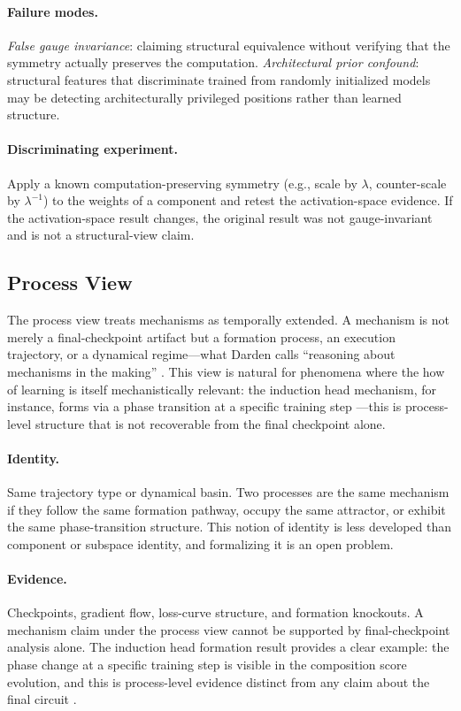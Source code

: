 \documentclass{article}
\begin{document}
\paragraph{Failure modes.}
\emph{False gauge invariance}: claiming structural equivalence without
verifying that the symmetry actually preserves the computation.
\emph{Architectural prior confound}: structural features that
discriminate trained from randomly initialized models may be detecting
architecturally privileged positions rather than learned structure.

\paragraph{Discriminating experiment.}
Apply a known computation-preserving symmetry (e.g., scale by $\lambda$,
counter-scale by $\lambda^{-1}$) to the weights of a component and
retest the activation-space evidence.  If the activation-space result
changes, the original result was not gauge-invariant and is not a
structural-view claim.

\subsection{Process View}

The process view treats mechanisms as temporally extended.  A mechanism
is not merely a final-checkpoint artifact but a formation process, an
execution trajectory, or a dynamical regime---what Darden calls
``reasoning about mechanisms in the making'' \citep{darden2006}.  This
view is natural for phenomena where the how of learning is itself
mechanistically relevant:
the induction head mechanism, for instance, forms via a phase transition
at a specific training step \citep{olsson2022}---this is process-level
structure that is not recoverable from the final checkpoint alone.

\paragraph{Identity.}
Same trajectory type or dynamical basin.  Two processes are the same
mechanism if they follow the same formation pathway, occupy the same
attractor, or exhibit the same phase-transition structure.  This notion
of identity is less developed than component or subspace identity, and
formalizing it is an open problem.

\paragraph{Evidence.}
Checkpoints, gradient flow, loss-curve structure, and formation knockouts.
A mechanism claim under the process view cannot be supported by
final-checkpoint analysis alone.  The induction head formation result
provides a clear example: the phase change at a specific training step
is visible in the composition score evolution, and this is process-level
evidence distinct from any claim about the final circuit \citep{olsson2022}.
\end{document}
